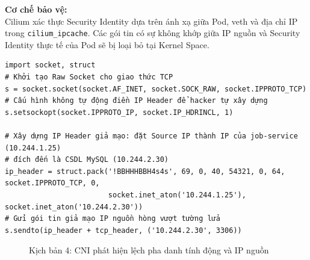 \textbf{Cơ chế bảo vệ:}\\
Cilium xác thực Security Identity dựa trên ánh xạ giữa Pod, veth và địa chỉ IP trong \texttt{cilium_ipcache}. Các gói tin có sự không khớp giữa IP nguồn và Security Identity thực tế của Pod sẽ bị loại bỏ tại Kernel Space.

\begin{listing}[H]
\begin{verbatim}
import socket, struct
# Khởi tạo Raw Socket cho giao thức TCP
s = socket.socket(socket.AF_INET, socket.SOCK_RAW, socket.IPPROTO_TCP)
# Cấu hình không tự động điền IP Header để hacker tự xây dựng
s.setsockopt(socket.IPPROTO_IP, socket.IP_HDRINCL, 1)

# Xây dựng IP Header giả mạo: đặt Source IP thành IP của job-service (10.244.1.25)
# đích đến là CSDL MySQL (10.244.2.30)
ip_header = struct.pack('!BBHHHBBH4s4s', 69, 0, 40, 54321, 0, 64, socket.IPPROTO_TCP, 0,
                        socket.inet_aton('10.244.1.25'), socket.inet_aton('10.244.2.30'))
# Gửi gói tin giả mạo IP nguồn hòng vượt tường lửa
s.sendto(ip_header + tcp_header, ('10.244.2.30', 3306))
\end{verbatim}
\caption{Kịch bản Python xây dựng thủ công Raw Socket để giả mạo IP}
\label{lst:kb4_raw_socket_script}
\end{listing}


\begin{figure}[H]
\centering
{}
\caption{Kịch bản 4: CNI phát hiện lệch pha danh tính động và IP nguồn}
\label{fig:kb4_identity_spoofing}
\end{figure}

